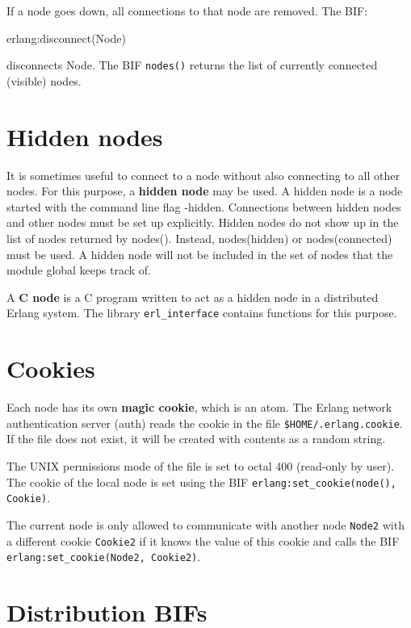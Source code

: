 If a node goes down, all connections to that node are removed. The
BIF:

\begin{erlang}
erlang:disconnect(Node)
\end{erlang}

disconnects Node. The BIF \texttt{nodes()} returns the list of
currently connected (visible) nodes.


\section{Hidden nodes}
It is sometimes useful to connect to a node without also connecting to
all other nodes. For this purpose, a \textbf{hidden node} may be
used. A hidden node is a node started with the command line flag
-hidden. Connections between hidden nodes and other nodes must be set
up explicitly. Hidden nodes do not show up in the list of nodes
returned by nodes(). Instead, nodes(hidden) or nodes(connected) must
be used. A hidden node will not be included in the set of nodes that
the module global keeps track of.

A \textbf{C node} is a C program written to act as a hidden node in a
distributed Erlang system. The library \texttt{erl\_interface}
contains functions for this purpose.


\section{Cookies}
Each node has its own \textbf{magic cookie}, which is an atom. The
Erlang network authentication server (auth) reads the cookie in the
file \texttt{\$HOME/.erlang.cookie}. If the file does not exist, it
will be created with contents as a random string.

The UNIX permissions mode of the file is set to octal 400 (read-only
by user). The cookie of the local node is set using the BIF
\texttt{erlang:set\_cookie(node(), Cookie)}.

The current node is only allowed to communicate with another node
\texttt{Node2} with a different cookie \texttt{Cookie2} if it knows
the value of this cookie and calls the BIF
\texttt{erlang:set\_cookie(Node2, Cookie2)}.


\section{Distribution BIFs}

